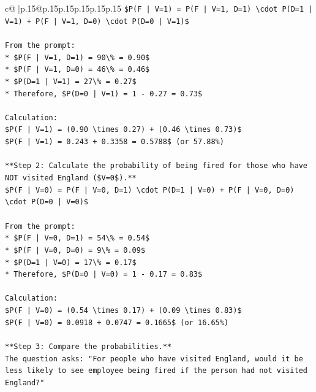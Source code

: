\documentclass{article}
\begin{document}
{\begin{supertabular}{c@{$\;$}|p{.15\linewidth}@{}p{.15\linewidth}p{.15\linewidth}p{.15\linewidth}p{.15\linewidth}p{.15\linewidth}}
{{{\texttt{\$P(F | V=1) = P(F | V=1, D=1) \textbackslash{}cdot P(D=1 | V=1) + P(F | V=1, D=0) \textbackslash{}cdot P(D=0 | V=1)\$} \\
\\ 
\texttt{From the prompt:} \\
\texttt{*   \$P(F | V=1, D=1) = 90\textbackslash{}\% = 0.90\$} \\
\texttt{*   \$P(F | V=1, D=0) = 46\textbackslash{}\% = 0.46\$} \\
\texttt{*   \$P(D=1 | V=1) = 27\textbackslash{}\% = 0.27\$} \\
\texttt{*   Therefore, \$P(D=0 | V=1) = 1 {-} 0.27 = 0.73\$} \\
\\ 
\texttt{Calculation:} \\
\texttt{\$P(F | V=1) = (0.90 \textbackslash{}times 0.27) + (0.46 \textbackslash{}times 0.73)\$} \\
\texttt{\$P(F | V=1) = 0.243 + 0.3358 = 0.5788\$ (or 57.88\%)} \\
\\ 
\texttt{**Step 2: Calculate the probability of being fired for those who have NOT visited England (\$V=0\$).**} \\
\texttt{\$P(F | V=0) = P(F | V=0, D=1) \textbackslash{}cdot P(D=1 | V=0) + P(F | V=0, D=0) \textbackslash{}cdot P(D=0 | V=0)\$} \\
\\ 
\texttt{From the prompt:} \\
\texttt{*   \$P(F | V=0, D=1) = 54\textbackslash{}\% = 0.54\$} \\
\texttt{*   \$P(F | V=0, D=0) = 9\textbackslash{}\% = 0.09\$} \\
\texttt{*   \$P(D=1 | V=0) = 17\textbackslash{}\% = 0.17\$} \\
\texttt{*   Therefore, \$P(D=0 | V=0) = 1 {-} 0.17 = 0.83\$} \\
\\ 
\texttt{Calculation:} \\
\texttt{\$P(F | V=0) = (0.54 \textbackslash{}times 0.17) + (0.09 \textbackslash{}times 0.83)\$} \\
\texttt{\$P(F | V=0) = 0.0918 + 0.0747 = 0.1665\$ (or 16.65\%)} \\
\\ 
\texttt{**Step 3: Compare the probabilities.**} \\
\texttt{The question asks: "For people who have visited England, would it be less likely to see employee being fired if the person had not visited England?"} \\
}}}
\end{supertabular}}
\end{document}

